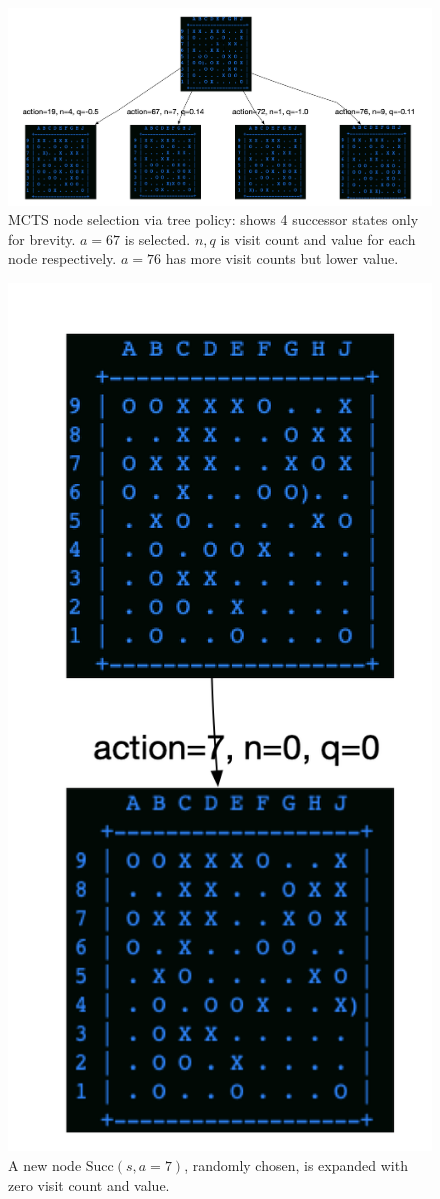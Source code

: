 \documentclass{article}
\begin{document}
\begin{figure}
\centering
\includegraphics[width=1.0\linewidth]{mctsselect}
\caption{MCTS node selection via tree policy: shows 4 successor states only for brevity. $a=67$ is selected. $n, q$ is visit count and value for each node respectively. $a=76$ has more visit counts but lower value.}
\label{fig:mctsselect}
\end{figure}

\begin{figure}
\centering
\includegraphics[width=0.3\linewidth]{mctsexpand}
\caption{A new node $\text{Succ}(s, a=7)$, randomly chosen, is expanded with zero visit count and value. }
\label{fig:mctsexpand}
\end{figure}
\end{document}
